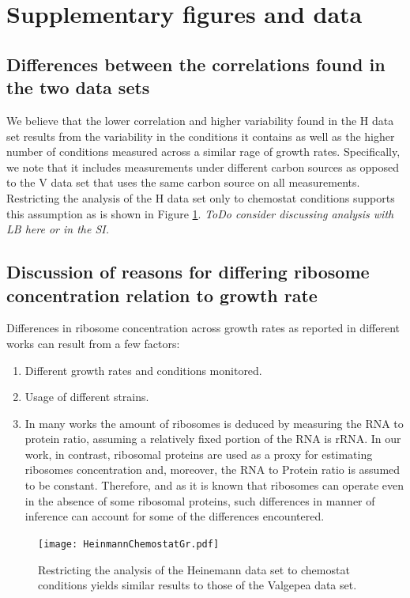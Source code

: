 \documentclass[notitlepage]{article}
\begin{document}
\section{Supplementary figures and data}
\subsection{Differences between the correlations found in the two data sets}
\label{heinemannchemo}
We believe that the lower correlation and higher variability found in the H data set results from the variability in the conditions it contains as well as the higher number of conditions measured across a similar rage of growth rates.
Specifically, we note that it includes measurements under different carbon sources as opposed to the V data set that uses the same carbon source on all measurements.
Restricting the analysis of the H data set only to chemostat conditions supports this assumption as is shown in Figure \ref{fig:growthcorrchemo}.
\emph{ToDo consider discussing analysis with LB here or in the SI.}

\subsection{Discussion of reasons for differing ribosome concentration relation to growth rate}
\label{ribosomeconc}
Differences in ribosome concentration  across growth rates as reported in different works can result from a few factors:
\begin{enumerate}
\item Different growth rates and conditions monitored.
\item Usage of different strains.
\item In many works the amount of ribosomes is deduced by measuring the RNA to protein ratio, assuming a relatively fixed portion of the RNA is rRNA.
In our work, in contrast, ribosomal proteins are used as a proxy for estimating ribosomes concentration and, moreover, the RNA to Protein ratio is assumed to be constant.
Therefore, and as it is known that ribosomes can operate even in the absence of some ribosomal proteins, such differences in manner of inference can account for some of the differences encountered.
\end{enumerate}

\begin{figure}[h]
\centering
\texttt{[image: HeinmannChemostatGr.pdf]}
\caption{
  Restricting the analysis of the Heinemann data set to chemostat conditions yields similar results to those of the Valgepea data set.
}
\label{fig:growthcorrchemo}
\end{figure}
\end{document}
